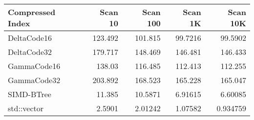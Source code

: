 \begin{tabular}{lrrrr}
\hline
 Compressed Index   &   Scan 10 &   Scan 100 &   Scan 1K &   Scan 10K \\
\hline
 DeltaCode16        &  123.492  &  101.815   &  99.7216  &  99.5902   \\
 DeltaCode32        &  179.717  &  148.469   & 146.481   & 146.433    \\
 GammaCode16        &  138.03   &  116.485   & 112.413   & 112.255    \\
 GammaCode32        &  203.892  &  168.523   & 165.228   & 165.047    \\
 SIMD-BTree         &   11.385  &   10.5871  &   6.91615 &   6.60085  \\
 std::vector        &    2.5901 &    2.01242 &   1.07582 &   0.934759 \\
\hline
\end{tabular}
